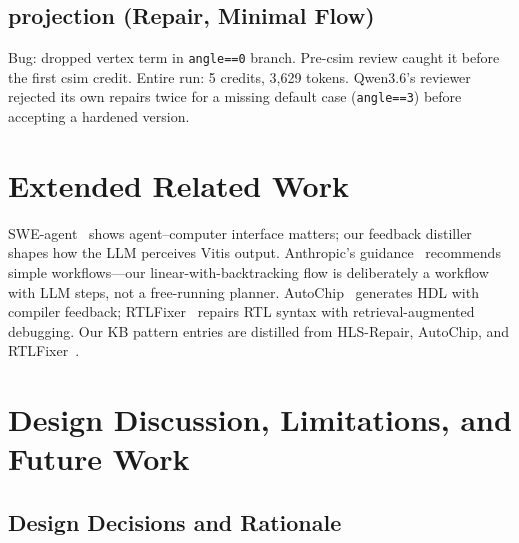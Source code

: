 \documentclass[10pt,conference,letterpaper]{IEEEtran}
\begin{document}
\subsection{projection (Repair, Minimal Flow)}

Bug: dropped vertex term in \texttt{angle==0} branch. Pre-csim review caught it before the first csim credit. Entire run: 5 credits, 3,629 tokens. Qwen3.6's reviewer rejected its own repairs twice for a missing default case (\texttt{angle==3}) before accepting a hardened version.

\section{Extended Related Work}
\label{app:related}

SWE-agent~\cite{sweagent} shows agent--computer interface matters; our feedback distiller shapes how the LLM perceives Vitis output. Anthropic's guidance~\cite{anthropicagents} recommends simple workflows---our linear-with-backtracking flow is deliberately a workflow with LLM steps, not a free-running planner. AutoChip~\cite{autochip} generates HDL with compiler feedback; RTLFixer~\cite{rtlfixer} repairs RTL syntax with retrieval-augmented debugging. Our KB pattern entries are distilled from HLS-Repair, AutoChip, and RTLFixer~\cite{hlsrepair,autochip,rtlfixer}.

\section{Design Discussion, Limitations, and Future Work}
\label{app:discussion}

\subsection{Design Decisions and Rationale}
\end{document}
